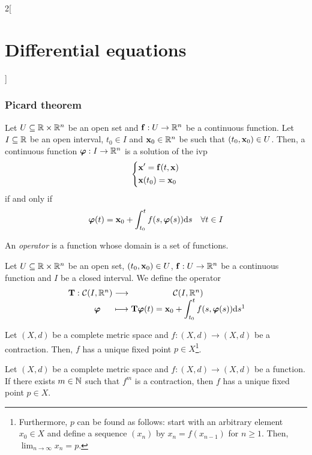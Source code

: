 \documentclass[../../../main.tex]{subfiles}
\begin{document}
\begin{multicols}{2}[\section{Differential equations}]
  \subsubsection{Picard theorem}
  \begin{prop}
    Let $U\subseteq\mathbb{R}\times\mathbb{R}^n$ be an open set and $\boldsymbol{\mathrm{f}}:U\rightarrow\mathbb{R}^n$ be a continuous function. Let $I\subseteq\mathbb{R}$ be an open interval, $t_0\in I$ and $\boldsymbol{\mathrm{x}}_0\in\mathbb{R}^n$ be such that $(t_0,\boldsymbol{\mathrm{x}}_0)\in U$. Then, a continuous function $\boldsymbol{\mathrm{\varphi}}:I\rightarrow\mathbb{R}^n$ is a solution of the ivp
    \begin{equation}
      \left\{
      \begin{aligned}
         & \boldsymbol{\mathrm{x}}'=\boldsymbol{\mathrm{f}}(t,\boldsymbol{\mathrm{x}}) \\
         & \boldsymbol{\mathrm{x}}(t_0)=\boldsymbol{\mathrm{x}}_0
      \end{aligned}
      \right.
      \label{DE_ivp}
    \end{equation}
    if and only if $$\boldsymbol{\mathrm{\varphi}}(t)=\boldsymbol{\mathrm{x}}_0+\int_{t_0}^tf(s,\boldsymbol{\mathrm{\varphi}}(s))\dd s\quad\forall t\in I$$
  \end{prop}
  \begin{definition}
    An \emph{operator} is a function whose domain is a set of functions.
  \end{definition}
  \begin{definition}
    Let $U\subseteq\mathbb{R}\times\mathbb{R}^n$ be an open set, $(t_0,\boldsymbol{\mathrm{x}}_0)\in U$, $\boldsymbol{\mathrm{f}}:U\rightarrow\mathbb{R}^n$ be a continuous function and $I$ be a closed interval. We define the operator
    $$
      \function{\vf{T}}
      {\mathcal{C}(I,\RR^n)}
      {\mathcal{C}(I,\RR^n)}
      {\vf{\varphi}}
      {\displaystyle\vf{T}\vf{\varphi}(t)=\vf{x}_0+\int_{t_0}^tf(s,\vf{\varphi}(s))\dd s\footnotemark}
    $$
  \end{definition}
  \begin{theorem}
    Let $(X,d)$ be a complete metric space and $f:(X,d)\rightarrow (X,d)$ be a contraction. Then, $f$ has a unique fixed point $p\in X$\footnote{Furthermore, $p$ can be found as follows: start with an arbitrary element $x_0\in X$ and define a sequence $(x_n)$ by $x_n=f(x_{n-1})$ for $n\geq 1$. Then, $\displaystyle\lim_{n\to\infty} x_n=p$.}.
  \end{theorem}
  \begin{corollary}
    Let $(X,d)$ be a complete metric space and $f:(X,d)\rightarrow (X,d)$ be a function. If there exists $m\in\mathbb{N}$ such that $f^m$ is a contraction, then $f$ has a unique fixed point $p\in X$.

\end{corollary}
\end{multicols}
\end{document}
